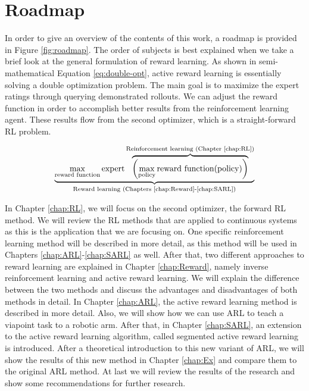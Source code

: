 \documentclass[mscThesis.tex]{subfiles}
\begin{document}
\section{Roadmap}
In order to give an overview of the contents of this work, a roadmap is provided in Figure \ref{fig:roadmap}. The order of subjects is best explained when we take a brief look at the general formulation of reward learning.
%
As shown in semi-mathematical Equation \eqref{eq:double-opt}, active reward learning is essentially solving a double optimization problem. The main goal is to maximize the expert ratings through querying demonstrated rollouts. We can adjust the reward function in order to accomplish better results from the reinforcement learning agent. These results flow from the second optimizer, which is a straight-forward RL problem.

\begin{equation}
\underbrace{\max_{\text{reward function}} \text{expert} \overbrace{ \left(  \max_{\text{policy}} \text{reward function} (\text{policy}) \right) }^{\text{Reinforcement learning (Chapter \ref{chap:RL})}}   }_\text{Reward learning (Chapters \ref{chap:Reward}-\ref{chap:SARL})}
\label{eq:double-opt}
\end{equation}

In Chapter \ref{chap:RL}, we will focus on the second optimizer, the forward RL method. We will review the RL methods that are applied to continuous systems as this is the application that we are focusing on. One specific reinforcement learning method will be described in more detail, as this method will be used in Chapters \ref{chap:ARL}-\ref{chap:SARL} as well. After that, two different approaches to reward learning are explained in Chapter \ref{chap:Reward}, namely inverse reinforcement learning and active reward learning. We will explain the difference between the two methods and discuss the advantages and disadvantages of both methods in detail. In Chapter \ref{chap:ARL}, the active reward learning method is described in more detail. Also, we will show how we can use ARL to teach a viapoint task to a robotic arm. After that, in Chapter \ref{chap:SARL}, an extension to the active reward learning algorithm, called segmented active reward learning is introduced. After a theoretical introduction to this new variant of ARL, we will show the results of this new method in Chapter \ref{chap:Ex} and compare them to the original ARL method. At last we will review the results of the research and show some recommendations for further research. 
\end{document}
